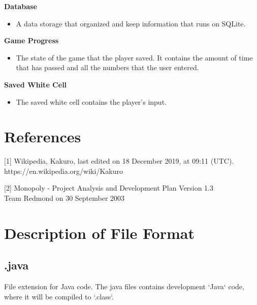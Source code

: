 \documentclass[12pt]{article}
\begin{document}
\textbf{Database}
\vspace{5mm}
\begin{itemize}
   \item A data storage that organized and keep information that runs on SQLite.
\end{itemize}

\vspace{5mm}

\textbf{Game Progress}
\vspace{5mm}
\begin{itemize}
   \item The state of the game that the player saved. It contains the amount of time that has passed and all the numbers that the user entered.
\end{itemize}

\vspace{5mm}

\textbf{Saved White Cell}
\vspace{5mm}
\begin{itemize}
   \item The saved white cell contains the player's input.
\end{itemize}

\vspace{5mm}

\newpage

\section{References}

[1] Wikipedia, Kakuro, last edited on 18 December 2019, at 09:11 (UTC). \\
https://en.wikipedia.org/wiki/Kakuro

\vspace{5mm}
  
[2] Monopoly - Project Analysis and Development Plan Version 1.3 \\
Team Redmond on 30 September 2003

\setlength{\parindent}{10ex}

\newpage

\section{Description of File Format}

\subsection{.java}
File extension for Java code. The java files contains development `Java` code, where it will be compiled to `.class`.
\end{document}
